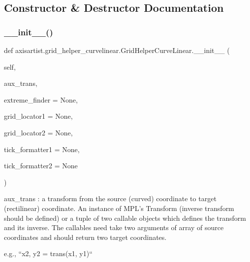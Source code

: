 \subsection{Constructor \& Destructor Documentation}
\mbox{\label{classaxisartist_1_1grid__helper__curvelinear_1_1GridHelperCurveLinear_ae217a60ad6b884d7bf4e0e1f3098b34c}} 
\subsubsection{\texorpdfstring{\+\_\+\+\_\+init\+\_\+\+\_\+()}{\_\_init\_\_()}}
{\footnotesize\ttfamily def axisartist.\+grid\+\_\+helper\+\_\+curvelinear.\+Grid\+Helper\+Curve\+Linear.\+\_\+\+\_\+init\+\_\+\+\_\+ (\begin{DoxyParamCaption}\item[{}]{self,  }\item[{}]{aux\+\_\+trans,  }\item[{}]{extreme\+\_\+finder = {\ttfamily None},  }\item[{}]{grid\+\_\+locator1 = {\ttfamily None},  }\item[{}]{grid\+\_\+locator2 = {\ttfamily None},  }\item[{}]{tick\+\_\+formatter1 = {\ttfamily None},  }\item[{}]{tick\+\_\+formatter2 = {\ttfamily None} }\end{DoxyParamCaption})}

\begin{DoxyVerb}aux_trans : a transform from the source (curved) coordinate to
target (rectilinear) coordinate. An instance of MPL's Transform
(inverse transform should be defined) or a tuple of two callable
objects which defines the transform and its inverse. The callables
need take two arguments of array of source coordinates and
should return two target coordinates.

e.g., ``x2, y2 = trans(x1, y1)``
\end{DoxyVerb}
 

